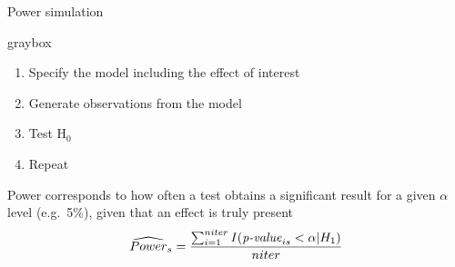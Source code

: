 \documentclass[aspectratio=169]{beamer}
\newenvironment{colbox}[1][\textwidth]%
  {\begin{beamercolorbox}[wd=#1, rounded=true, shadow=true]{graybox}}
  {\end{beamercolorbox}}
\begin{document}
\begin{frame}{Power simulation}


\begin{colbox}
\begin{enumerate}
\item Specify the model including the effect of interest

\item Generate observations from the model

\item Test H$_0$

\item Repeat
\end{enumerate}
\end{colbox}

\vspace{3ex}

Power corresponds to how often a test obtains a significant result for a given $\alpha$ level (e.g.~5\%), given that an effect is truly present
\vspace{0.4cm}
\begin{equation*}
\widehat{Power}_s = \frac{\sum_{i = 1}^{niter} I(\mbox{\emph{p-value}}_{is} < \alpha | H_1)}{niter}
\end{equation*}


\end{frame}

%
\end{document}
